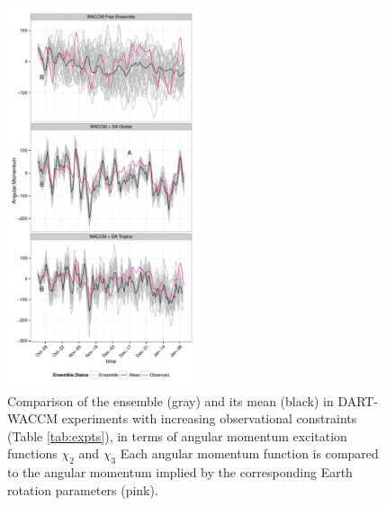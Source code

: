 \begin{figure}
	 \includegraphics[width=0.5\textwidth]{Paper_figures/ERPDA_paper_evalvariable_aam_space_X2only.pdf}
	 \caption{Comparison of the ensemble (gray) and its mean (black) in DART-WACCM experiments with increasing observational constraints (Table \ref{tab:expts}), in terms of angular momentum excitation functions $\chi_2$ and $\chi_3$ Each angular momentum function is compared to the angular momentum implied by the corresponding Earth rotation parameters (pink).}
	 \label{fig:evalvariable_aam}
\end{figure}
